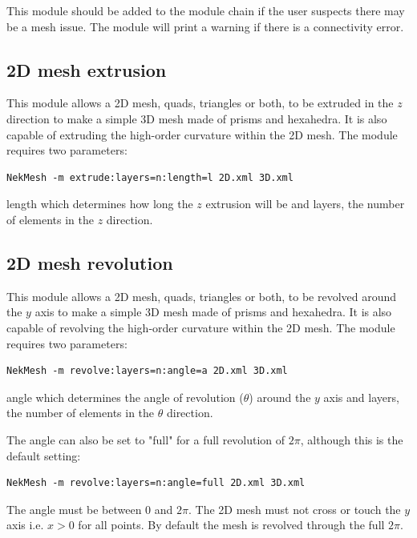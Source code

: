 This module should be added to the module chain if the user suspects there may
be a mesh issue. The module will print a warning if there is a connectivity
error.

\subsection{2D mesh extrusion}

This module allows a 2D mesh, quads, triangles or both, to be extruded in the
$z$ direction to make a simple 3D mesh made of prisms and hexahedra. It is also
capable of extruding the high-order curvature within the 2D mesh. The module
requires two parameters:

\begin{lstlisting}[style=BashInputStyle]
  NekMesh -m extrude:layers=n:length=l 2D.xml 3D.xml
\end{lstlisting}

length which determines how long the $z$ extrusion will be and layers, the
number of elements in the $z$ direction.

\subsection{2D mesh revolution}

This module allows a 2D mesh, quads, triangles or both, to be revolved around
the $y$ axis to make a simple 3D mesh made of prisms and hexahedra. It is also
capable of revolving the high-order curvature within the 2D mesh. The module
requires two parameters:

\begin{lstlisting}[style=BashInputStyle]
  NekMesh -m revolve:layers=n:angle=a 2D.xml 3D.xml
\end{lstlisting}
angle which determines the angle of revolution ($\theta$) around the $y$ axis and 
layers, the number of elements in the $\theta$ direction.

The angle can also be set to "full" for a full revolution of $2\pi$, although
this is the default setting:

\begin{lstlisting}[style=BashInputStyle]
NekMesh -m revolve:layers=n:angle=full 2D.xml 3D.xml
\end{lstlisting}

The angle must be between $0$ and $2\pi$.
The 2D mesh must not cross or touch the $y$ axis i.e. $x>0$ for all points.
By default the mesh is revolved through the full $2\pi$.

